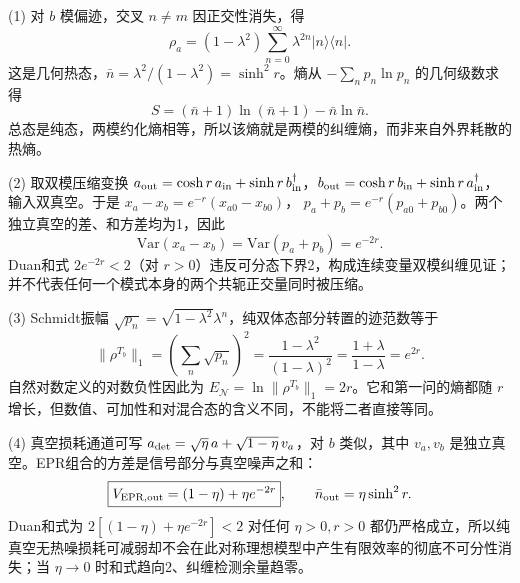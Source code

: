 (1) 对 \(b\) 模偏迹，交叉 \(n\ne m\) 因正交性消失，得
\[
\rho_a=(1-\lambda^2)\sum_{n=0}^\infty\lambda^{2n}|n\rangle\langle n|.
\]
这是几何热态，\(\bar n=\lambda^2/(1-\lambda^2)=\sinh^2r\)。熵从 \(-\sum_np_n\ln p_n\) 的几何级数求得
\[
\boxed{S=(\bar n+1)\ln(\bar n+1)-\bar n\ln\bar n}.
\]
总态是纯态，两模约化熵相等，所以该熵就是两模的纠缠熵，而非来自外界耗散的热熵。

(2) 取双模压缩变换 \(a_{\rm out}=\cosh r\,a_{\rm in}+\sinh r\,b_{\rm in}^\dagger\)，\(b_{\rm out}=\cosh r\,b_{\rm in}+\sinh r\,a_{\rm in}^\dagger\)，输入双真空。于是
\(x_a-x_b=e^{-r}(x_{a0}-x_{b0})\)，
\(p_a+p_b=e^{-r}(p_{a0}+p_{b0})\)。两个独立真空的差、和方差均为1，因此
\[
\boxed{\mathrm{Var}(x_a-x_b)=\mathrm{Var}(p_a+p_b)=e^{-2r}}.
\]
Duan和式 \(2e^{-2r}<2\)（对 \(r>0\)）违反可分态下界2，构成连续变量双模纠缠见证；并不代表任何一个模式本身的两个共轭正交量同时被压缩。

(3) Schmidt振幅 \(\sqrt{p_n}=\sqrt{1-\lambda^2}\lambda^n\)，纯双体态部分转置的迹范数等于
\[
\|\rho^{T_b}\|_1=(\sum_n\sqrt{p_n})^2
=\frac{1-\lambda^2}{(1-\lambda)^2}
=\frac{1+\lambda}{1-\lambda}=e^{2r}.
\]
自然对数定义的对数负性因此为 \(\boxed{E_{\mathcal N}=\ln\|\rho^{T_b}\|_1=2r}\)。它和第一问的熵都随 \(r\) 增长，但数值、可加性和对混合态的含义不同，不能将二者直接等同。

(4) 真空损耗通道可写 \(a_{\rm det}=\sqrt\eta\,a+\sqrt{1-\eta}\,v_a\)，对 \(b\) 类似，其中 \(v_a,v_b\) 是独立真空。EPR组合的方差是信号部分与真空噪声之和：
\[
\boxed{V_{\rm EPR,out}=(1-\eta)+\eta e^{-2r}},\qquad
\bar n_{\rm out}=\eta\sinh^2r.
\]
Duan和式为 \(2[(1-\eta)+\eta e^{-2r}]<2\) 对任何 \(\eta>0,r>0\) 都仍严格成立，所以纯真空无热噪损耗可减弱却不会在此对称理想模型中产生有限效率的彻底不可分性消失；当 \(\eta\to0\) 时和式趋向2、纠缠检测余量趋零。

